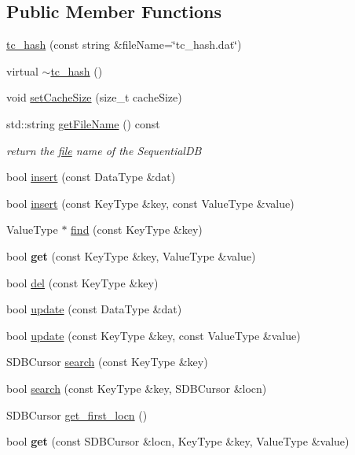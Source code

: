 \subsection*{Public Member Functions}
\begin{CompactItemize}
\item 
\hyperlink{classtc__hash_f65eca712c3a612bb1ce1defa865659f}{tc\_\-hash} (const string \&fileName=\char`\"{}tc\_\-hash.dat\char`\"{})
\item 
virtual \hyperlink{classtc__hash_1f9a677246db4a5a14be9fb7a5b3547b}{$\sim$tc\_\-hash} ()
\item 
void \hyperlink{classtc__hash_95514cd1ac7f01332038973d0c8db323}{setCacheSize} (size\_\-t cacheSize)
\item 
\hypertarget{classtc__hash_2061749cebcb6e13d1ed08b807b9f2f4}{
std::string \hyperlink{classtc__hash_2061749cebcb6e13d1ed08b807b9f2f4}{getFileName} () const }
\label{classtc__hash_2061749cebcb6e13d1ed08b807b9f2f4}

\begin{CompactList}\small\item\em return the \hyperlink{classfile}{file} name of the SequentialDB \item\end{CompactList}\item 
bool \hyperlink{classtc__hash_dec46db22458aace6d4c384d0136f73a}{insert} (const DataType \&dat)
\item 
bool \hyperlink{classtc__hash_a0f14b10040effe879ba2deb5c0a961b}{insert} (const KeyType \&key, const ValueType \&value)
\item 
ValueType $\ast$ \hyperlink{classtc__hash_f6288e85c3973f121c25a39c0cab55ec}{find} (const KeyType \&key)
\item 
\hypertarget{classtc__hash_89cb493b5270be235141cd5131806e10}{
bool \textbf{get} (const KeyType \&key, ValueType \&value)}
\label{classtc__hash_89cb493b5270be235141cd5131806e10}

\item 
bool \hyperlink{classtc__hash_ace3bd9142e9e66ca01aa0de990d145e}{del} (const KeyType \&key)
\item 
bool \hyperlink{classtc__hash_d9f9b4ea4cf3424ca2112bb1ba9293f2}{update} (const DataType \&dat)
\item 
bool \hyperlink{classtc__hash_2aa23c6cb581dae26a9bf2f98e313f00}{update} (const KeyType \&key, const ValueType \&value)
\item 
SDBCursor \hyperlink{classtc__hash_996ea5e3297bcbce4c6a7a0ca8e17d21}{search} (const KeyType \&key)
\item 
bool \hyperlink{classtc__hash_57246a88334c225644111bbf0a127e8e}{search} (const KeyType \&key, SDBCursor \&locn)
\item 
SDBCursor \hyperlink{classtc__hash_3c7efb056e568de793b82a30c66f9640}{get\_\-first\_\-locn} ()
\item 
\hypertarget{classtc__hash_e8d97949604477ba8f6b59ce3d3e976f}{
bool \textbf{get} (const SDBCursor \&locn, KeyType \&key, ValueType \&value)}
\label{classtc__hash_e8d97949604477ba8f6b59ce3d3e976f}


\end{CompactItemize}
